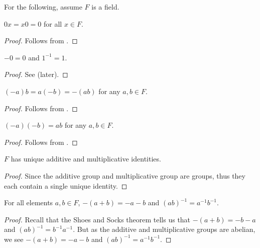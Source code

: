 For the following, assume $F$ is a field.

\begin{proposition}
    $0x = x0 = 0$ for all $x \in F$.
\end{proposition}
\begin{proof}
    Follows from .
\end{proof}

\begin{proposition}
    $-0 = 0$ and $1^{-1} = 1$.
\end{proposition}
\begin{proof}
    See  (later).
\end{proof}

\begin{proposition}
    $(-a)b = a(-b) = -(ab)$ for any $a, b \in F$.
\end{proposition}
\begin{proof}
    Follows from .
\end{proof}

\begin{proposition}
    $(-a)(-b) = ab$ for any $a, b \in F$.
\end{proposition}
\begin{proof}
    Follows from .
\end{proof}

\begin{proposition}
    $F$ has unique additive and multiplicative identities.
\end{proposition}
\begin{proof}
    Since the additive group and multiplicative group are groups, thus they each contain a single unique identity.
\end{proof}

\begin{proposition}
    For all elements $a, b \in F$, $-(a+b) = -a-b$ and $(ab)^{-1} = a^{-1}b^{-1}$.
\end{proposition}
\begin{proof}
    Recall that the Shoes and Socks theorem tells us that $-(a+b) = -b - a$ and $(ab)^{-1} = b^{-1}a^{-1}$. But as the additive and multiplicative groups are abelian, we see $-(a+b) = -a-b$ and $(ab)^{-1} = a^{-1}b^{-1}$.
\end{proof}

